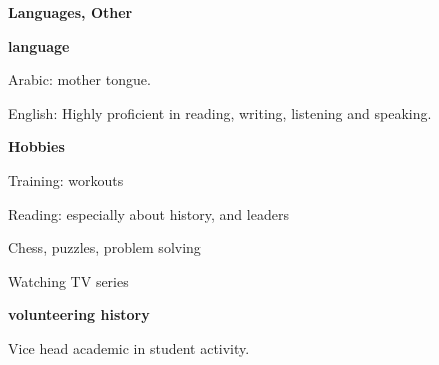 \documentclass[a4paper,13pt,final]{memoir}
\newcommand{\SmallSep}{\vspace{0.5em}}
\newcommand{\CVSection}[1]
	{\Large\textbf{#1}\par
	\SmallSep\normalsize\normalfont}
\newcommand{\CVItem}[1]
	{\textbf{\color{RoyalBlue} #1}}
\begin{document}
\CVSection{Languages, Other}
\CVItem{language}
\begin{compactitem}[\color{RoyalBlue}$\circ$]
	\item Arabic: mother tongue.
	\item English: Highly proficient in reading, writing, listening and speaking. 
\end{compactitem}
\SmallSep

\CVItem{Hobbies}
\begin{multicols}{2}
\begin{compactitem}[\color{RoyalBlue}$\circ$]
	\item Training: workouts
	\item Reading: especially about history, and leaders
	\item Chess, puzzles, problem solving
	\item Watching TV series
\end{compactitem}
\end{multicols}
\SmallSep


\CVItem{volunteering history}
\begin{compactitem}[\color{RoyalBlue}$\circ$]
	\item Vice head academic in student activity.
\end{compactitem}
\SmallSep

\end{document}
